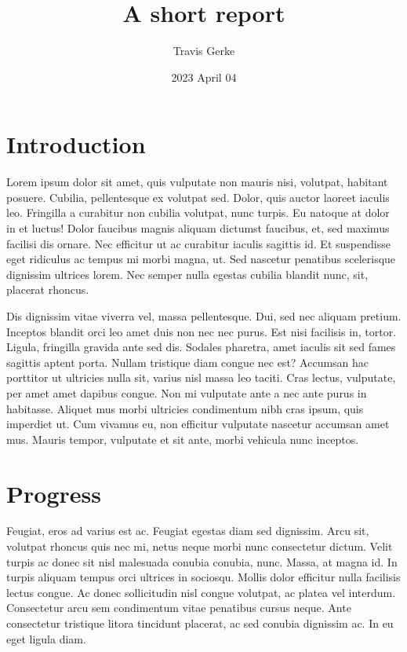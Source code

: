 \documentclass[
]{article}
\title{A short report}
\author{Travis Gerke}
\date{2023 April 04}
\begin{document}
\maketitle

\hypertarget{introduction}{%
\section{Introduction}\label{introduction}}

Lorem ipsum dolor sit amet, quis vulputate non mauris nisi, volutpat,
habitant posuere. Cubilia, pellentesque ex volutpat sed. Dolor, quis
auctor laoreet iaculis leo. Fringilla a curabitur non cubilia volutpat,
nunc turpis. Eu natoque at dolor in et luctus! Dolor faucibus magnis
aliquam dictumst faucibus, et, sed maximus facilisi dis ornare. Nec
efficitur ut ac curabitur iaculis sagittis id. Et suspendisse eget
ridiculus ac tempus mi morbi magna, ut. Sed nascetur penatibus
scelerisque dignissim ultrices lorem. Nec semper nulla egestas cubilia
blandit nunc, sit, placerat rhoncus.

Dis dignissim vitae viverra vel, massa pellentesque. Dui, sed nec
aliquam pretium. Inceptos blandit orci leo amet duis non nec nec purus.
Est nisi facilisis in, tortor. Ligula, fringilla gravida ante sed dis.
Sodales pharetra, amet iaculis sit sed fames sagittis aptent porta.
Nullam tristique diam congue nec est? Accumsan hac porttitor ut
ultricies nulla sit, varius nisl massa leo taciti. Cras lectus,
vulputate, per amet amet dapibus congue. Non mi vulputate ante a nec
ante purus in habitasse. Aliquet mus morbi ultricies condimentum nibh
cras ipsum, quis imperdiet ut. Cum vivamus eu, non efficitur vulputate
nascetur accumsan amet mus. Mauris tempor, vulputate et sit ante, morbi
vehicula nunc inceptos.

\hypertarget{progress}{%
\section{Progress}\label{progress}}

Feugiat, eros ad varius est ac. Feugiat egestas diam sed dignissim. Arcu
sit, volutpat rhoncus quis nec mi, netus neque morbi nunc consectetur
dictum. Velit turpis ac donec sit nisl malesuada conubia conubia, nunc.
Massa, at magna id. In turpis aliquam tempus orci ultrices in sociosqu.
Mollis dolor efficitur nulla facilisis lectus congue. Ac donec
sollicitudin nisl congue volutpat, ac platea vel interdum. Consectetur
arcu sem condimentum vitae penatibus cursus neque. Ante consectetur
tristique litora tincidunt placerat, ac sed conubia dignissim ac. In eu
eget ligula diam.
\end{document}
